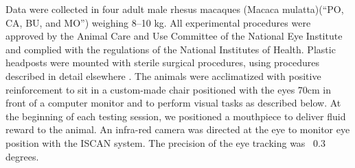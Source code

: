 Data were collected in four adult male rhesus macaques (Macaca mulatta)(“PO, CA, BU, and MO”) weighing 8–10 kg. 
All experimental procedures were approved by the Animal Care and Use Committee of the National Eye Institute and complied with the regulations of the National Institutes of Health. 
Plastic headposts were mounted with sterile surgical procedures, using procedures described in detail elsewhere \citep{lafer-sousa_parallel_2013}. 
The animals were acclimatized with positive reinforcement to sit in a custom-made chair positioned with the eyes 70cm in front of a computer monitor and to perform visual tasks as described below. 
At the beginning of each testing session, we positioned a mouthpiece to deliver fluid reward to the animal. 
An infra-red camera was directed at the eye to monitor eye position with the ISCAN system. 
The precision of the eye tracking was ~0.3 degrees. 